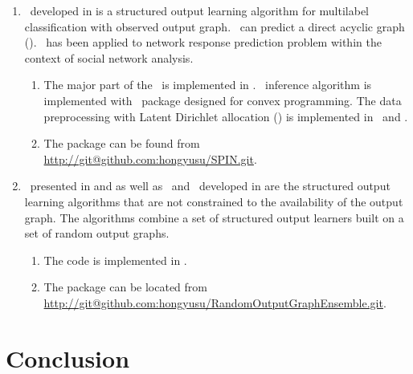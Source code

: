 {\begin{enumerate}
	\item \spin\ developed in  is a structured output learning algorithm for multilabel classification with observed output graph. \spin\ can predict a direct acyclic graph (\daggraph). \spin\ has been applied to network response prediction problem within the context of social network analysis.
	\begin{enumerate}
		\item The major part of the \spin\ is implemented in \matlab. \sdp\ inference algorithm is implemented with \cvx\ package designed for convex programming. The data preprocessing with Latent Dirichlet allocation (\lda) \citep{Blei03latent} is implemented in \python\ and \matlab.
		\item The package can be found from \url{http://git@github.com:hongyusu/SPIN.git}.
	\end{enumerate}
	
	\item \mve\ presented in  and  as well as \amm\ and \mam\ developed in  are the structured output learning algorithms that are not constrained to the availability of the output graph. The algorithms combine a set of structured output learners built on a set of random output graphs.
	\begin{enumerate}
		\item The code is implemented in \matlab.
		\item The package can be located from \url{http://git@github.com:hongyusu/RandomOutputGraphEnsemble.git}.
	\end{enumerate}

\end{enumerate}




%
%
\chapter{Conclusion} \label{ch_conclusion}


}
